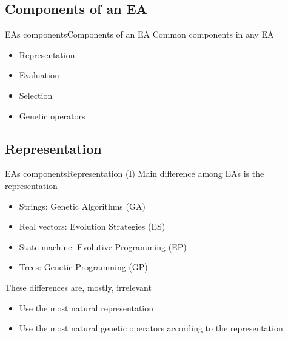 \documentclass[10pt,compress]{beamer} %
\begin{document}
\subsection{Components of an EA}
\begin{frame}{EAs components}{Components of an EA}
	Common components in any EA
	\begin{itemize}
		\item Representation
		\item Evaluation
		\item Selection
		\item Genetic operators
	\end{itemize}
\end{frame}

\subsection{Representation}
\begin{frame}{EAs components}{Representation (I)} 
	Main difference among EAs is the representation
	\begin{itemize}
		\item Strings: \alert{Genetic Algorithms (GA)}
		\item Real vectors: \alert{Evolution Strategies (ES)}
		\item State machine: \alert{Evolutive Programming (EP)}
		\item Trees: \alert{Genetic Programming (GP)}
	\end{itemize}
	These differences are, mostly, irrelevant
	\begin{itemize}
		\item Use the most natural representation
		\item Use the most natural genetic operators according to the representation
	\end{itemize}
\end{frame}
\end{document}
